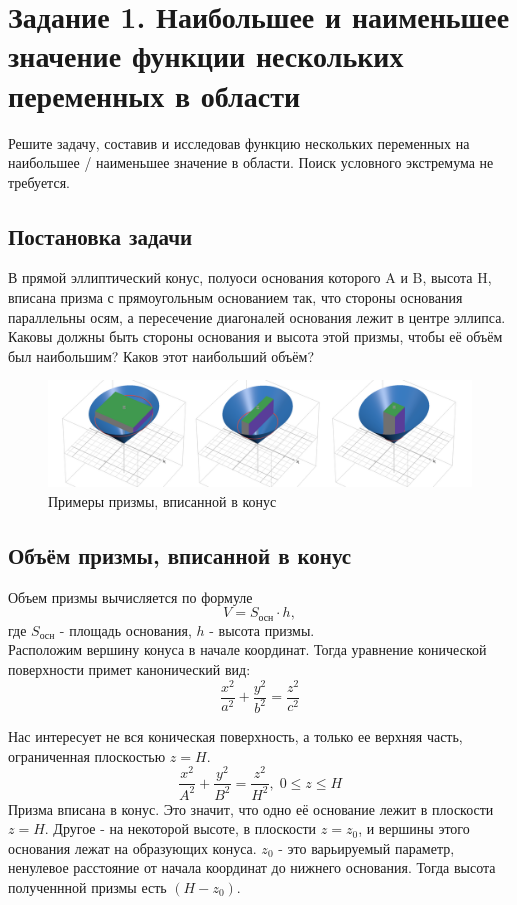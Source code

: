 \documentclass{article}
\begin{document}
\section{Задание 1. Наибольшее и наименьшее значение функции нескольких переменных в области}
Решите задачу, составив и исследовав функцию нескольких переменных на наибольшее / наименьшее значение в области. Поиск условного экстремума не требуется.



\subsection{Постановка задачи}
В прямой эллиптический конус, полуоси основания которого A и B,
высота H, вписана призма с прямоугольным основанием так, что
стороны основания параллельны осям, а пересечение диагоналей
основания лежит в центре эллипса. Каковы должны быть стороны
основания и высота этой призмы, чтобы её объём был наибольшим?
Каков этот наибольший объём?
\begin{figure}[H]
    \begin{center}
        \includegraphics[width=1\textwidth]{ex.png}
    \end{center}

\caption{Примеры призмы, вписанной в конус}
\end{figure}





\subsection{Объём призмы, вписанной в конус}
Объем призмы вычисляется по формуле
$$V = S_{\text{осн}} \cdot h,$$
где $S_{\text{осн}}$ - площадь основания, $h$ - высота призмы.\\
Расположим вершину конуса в начале координат. Тогда уравнение конической поверхности примет канонический вид:
$$
\frac{x^2}{a^2} + \frac{y^2}{b^2} = \frac{z^2}{c^2}
$$

Нас интересует не вся коническая поверхность, а только ее верхняя часть, ограниченная плоскостью $z = H$.
$$
\frac{x^2}{A^2} + \frac{y^2}{B^2} = \frac{z^2}{H^2}, \; 0 \leq z \leq H
$$
Призма вписана в конус. Это значит, что одно её основание лежит в плоскости $z = H$. Другое - на некоторой высоте, в плоскости $z = z_0$, и вершины этого основания лежат на образующих конуса. $z_0$ - это варьируемый параметр, ненулевое расстояние от начала координат до нижнего основания. Тогда высота полученнной призмы есть $(H - z_0)$.\\
\end{document}
